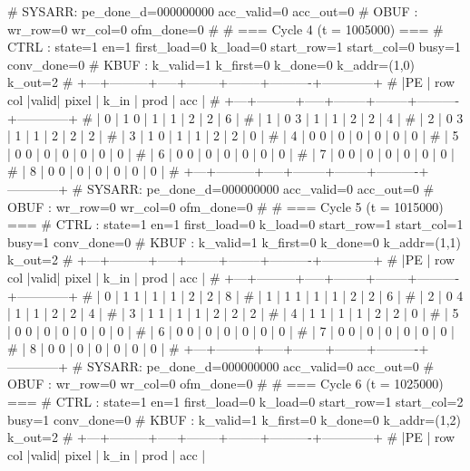 # SYSARR: pe_done_d=000000000 acc_valid=0 acc_out=0
# OBUF : wr_row=0 wr_col=0 ofm_done=0
# 
# === Cycle 4  (t = 1005000) ===
# CTRL : state=1 en=1 first_load=0 k_load=0 start_row=1 start_col=0 busy=1 conv_done=0
# KBUF : k_valid=1 k_first=0 k_done=0 k_addr=(1,0) k_out=2
# +---+---------+-----+--------+--------+----------+------------+
# |PE | row col |valid| pixel  |  k_in  |   prod   |    acc     |
# +---+---------+-----+--------+--------+----------+------------+
# | 0 |   1   0 |  1  |      1 |      2 |        2 |          6 |
# | 1 |   0   3 |  1  |      1 |      2 |        2 |          4 |
# | 2 |   0   3 |  1  |      1 |      2 |        2 |          2 |
# | 3 |   1   0 |  1  |      1 |      2 |        2 |          0 |
# | 4 |   0   0 |  0  |      0 |      0 |        0 |          0 |
# | 5 |   0   0 |  0  |      0 |      0 |        0 |          0 |
# | 6 |   0   0 |  0  |      0 |      0 |        0 |          0 |
# | 7 |   0   0 |  0  |      0 |      0 |        0 |          0 |
# | 8 |   0   0 |  0  |      0 |      0 |        0 |          0 |
# +---+---------+-----+--------+--------+----------+------------+
# SYSARR: pe_done_d=000000000 acc_valid=0 acc_out=0
# OBUF : wr_row=0 wr_col=0 ofm_done=0
# 
# === Cycle 5  (t = 1015000) ===
# CTRL : state=1 en=1 first_load=0 k_load=0 start_row=1 start_col=1 busy=1 conv_done=0
# KBUF : k_valid=1 k_first=0 k_done=0 k_addr=(1,1) k_out=2
# +---+---------+-----+--------+--------+----------+------------+
# |PE | row col |valid| pixel  |  k_in  |   prod   |    acc     |
# +---+---------+-----+--------+--------+----------+------------+
# | 0 |   1   1 |  1  |      1 |      2 |        2 |          8 |
# | 1 |   1   1 |  1  |      1 |      2 |        2 |          6 |
# | 2 |   0   4 |  1  |      1 |      2 |        2 |          4 |
# | 3 |   1   1 |  1  |      1 |      2 |        2 |          2 |
# | 4 |   1   1 |  1  |      1 |      2 |        2 |          0 |
# | 5 |   0   0 |  0  |      0 |      0 |        0 |          0 |
# | 6 |   0   0 |  0  |      0 |      0 |        0 |          0 |
# | 7 |   0   0 |  0  |      0 |      0 |        0 |          0 |
# | 8 |   0   0 |  0  |      0 |      0 |        0 |          0 |
# +---+---------+-----+--------+--------+----------+------------+
# SYSARR: pe_done_d=000000000 acc_valid=0 acc_out=0
# OBUF : wr_row=0 wr_col=0 ofm_done=0
# 
# === Cycle 6  (t = 1025000) ===
# CTRL : state=1 en=1 first_load=0 k_load=0 start_row=1 start_col=2 busy=1 conv_done=0
# KBUF : k_valid=1 k_first=0 k_done=0 k_addr=(1,2) k_out=2
# +---+---------+-----+--------+--------+----------+------------+
# |PE | row col |valid| pixel  |  k_in  |   prod   |    acc     |
